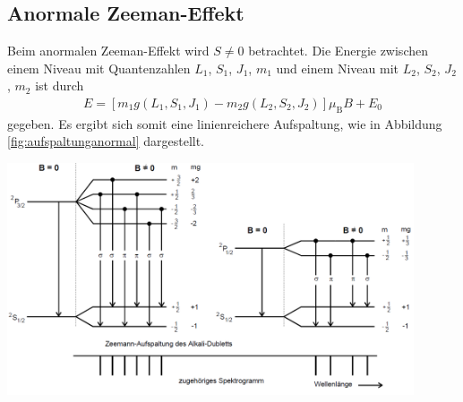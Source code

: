 \documentclass[captions=tableheading]{scrartcl}
\newcommand{\indx}[1]{\text{#1}}
\begin{document}
\subsection{Anormale Zeeman-Effekt}
Beim anormalen Zeeman-Effekt wird $S\neq 0$ betrachtet. 
Die Energie zwischen einem Niveau mit Quantenzahlen $L_1$, $S_1$, $J_1$, $m_1$ und einem Niveau mit $L_2$, $S_2$, $J_2$, $m_2$ ist durch 
\begin{align}
E=\left[ m_1 g\left(L_1,S_1,J_1 \right) - m_2 g\left(L_2,S_2,J_2 \right) \right] \mu_\indx{B}B+E_0
\end{align}
gegeben.
Es ergibt sich somit eine linienreichere Aufspaltung, wie in Abbildung \ref{fig:aufspaltunganormal} dargestellt.
\begin{center}
	\includegraphics[width=12cm]{images/aufspaltunganormal.png}
	\label{fig:aufspaltunganormal}
\end{center}
\end{document}
